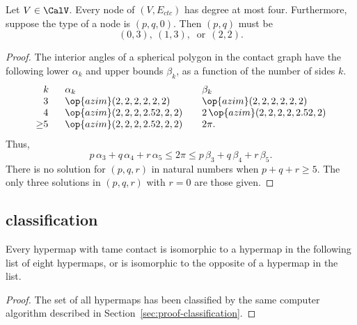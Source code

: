 



\begin{lemma}[]\label{lemma:no-5} 
  Let $V\in \CalV$.  Every node of $(V,E_{ctc})$ has degree at most
  four.  Furthermore, suppose the type of a node is $(p,q,0)$.  Then
  $(p,q)$ must be
\[
(0,3),~(1,3),~\text{ or}~~(2,2).
\]
\end{lemma}

\begin{proof} The interior angles of a spherical polygon in the
  contact graph have the following lower $\alpha_k$ and upper bounds
  $\beta_k$, as a function of the number of sides $k$.
\begin{equation}
\begin{array}{lllll}
  \phantom{\ge}k~~&\alpha_k & \beta_k\\
  \phantom{\ge}3~~&\op{azim}(2,2,2,2,2,2)  &\op{azim}(2,2,2,2,2,2)\\
  \phantom{\ge}4~~&\op{azim}(2,2,2,2.52,2,2) &2\,\op{azim}(2,2,2,2,2.52,2)\\
  {\ge}5~~& \op{azim}(2,2,2,2.52,2,2) ~~~& 2\pi.
\end{array}
\end{equation}
Thus,
\[
  p\,\alpha_3 + q\,\alpha_4 +r\, \alpha_5 
\le 2\pi \le p\,\beta_3 + q\,\beta_4 + r \,\beta_5.
\]
There is no solution for
$(p,q,r)$ in natural numbers when $p+q+r\ge 5$.
The only three solutions in $(p,q,r)$ with $r=0$
are those given. 
\end{proof}



\subsection{classification}


\begin{lemma}
  \label{lemma:contact-classification} Every hypermap with tame
  contact is isomorphic to a hypermap in the following list of eight
  hypermaps, or is isomorphic to the opposite of a hypermap in the
  list.  %
\end{lemma}

\begin{proof}
  The set of all hypermaps has been classified by the same computer
  algorithm described in Section~\ref{sec:proof-classification}.
\end{proof}



